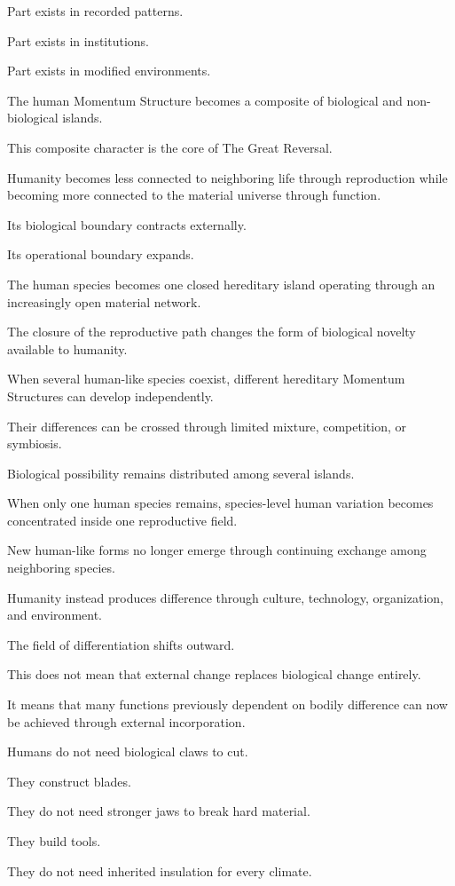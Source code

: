 Part exists in recorded patterns.

Part exists in institutions.

Part exists in modified environments.

The human Momentum Structure becomes a composite of biological and non-biological islands.

This composite character is the core of The Great Reversal.

Humanity becomes less connected to neighboring life through reproduction while becoming more connected to the material universe through function.

Its biological boundary contracts externally.

Its operational boundary expands.

The human species becomes one closed hereditary island operating through an increasingly open material network.

The closure of the reproductive path changes the form of biological novelty available to humanity.

When several human-like species coexist, different hereditary Momentum Structures can develop independently.

Their differences can be crossed through limited mixture, competition, or symbiosis.

Biological possibility remains distributed among several islands.

When only one human species remains, species-level human variation becomes concentrated inside one reproductive field.

New human-like forms no longer emerge through continuing exchange among neighboring species.

Humanity instead produces difference through culture, technology, organization, and environment.

The field of differentiation shifts outward.

This does not mean that external change replaces biological change entirely.

It means that many functions previously dependent on bodily difference can now be achieved through external incorporation.

Humans do not need biological claws to cut.

They construct blades.

They do not need stronger jaws to break hard material.

They build tools.

They do not need inherited insulation for every climate.

